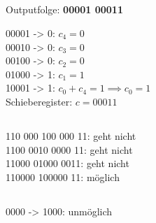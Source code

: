 \documentclass{article}
\begin{document}
\subsection{}

Outputfolge: \textbf{00001 00011}

00001 -> 0: $c_4 = 0$\\
00010 -> 0: $c_3 = 0$\\
00100 -> 0: $c_2 = 0$\\
01000 -> 1: $c_1 = 1$\\
10001 -> 1: $c_0 + c_4 = 1 \implies c_0 = 1$\\

Schieberegister: $c = 00011$

\subsection{}

110 000 100 000 11: geht nicht\\
1100 0010 0000 11: geht nicht\\
11000 01000 0011: geht nicht\\
110000 100000 11: möglich\\

\subsection{}

0000 -> 1000: unmöglich
\end{document}
